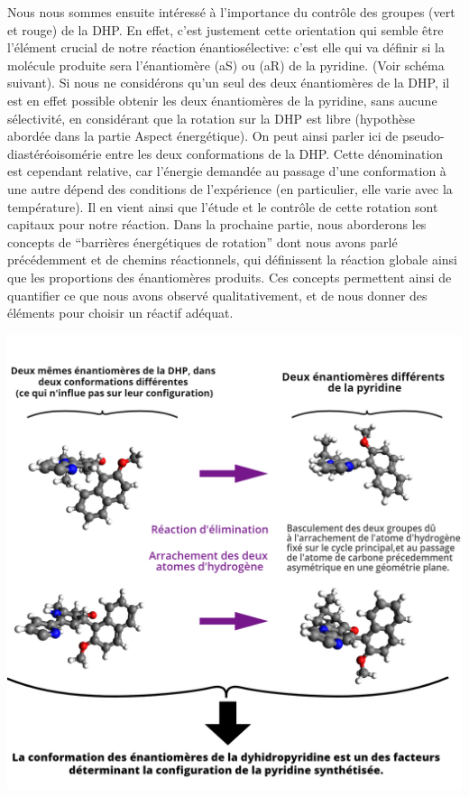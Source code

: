 \documentclass{article}
\begin{document}
Nous nous sommes ensuite intéressé à l’importance du contrôle des groupes (vert et rouge) de la DHP. En effet, c’est justement cette orientation qui semble être l’élément crucial de notre réaction énantiosélective: c’est elle qui va définir si la molécule produite sera l’énantiomère (aS) ou (aR) de la pyridine. (Voir schéma suivant).
\medbreak
Si nous ne considérons qu’un seul des deux énantiomères de la DHP, il est en effet possible obtenir les deux énantiomères de la pyridine, sans aucune sélectivité, en considérant que la rotation sur la DHP est libre (hypothèse abordée dans la partie Aspect énergétique).
On peut ainsi parler ici de pseudo-diastéréoisomérie entre les deux conformations de la DHP. Cette dénomination est cependant relative, car l'énergie demandée au passage d'une conformation à une autre dépend des conditions de l’expérience (en particulier, elle varie avec la température).
\medbreak
Il en vient ainsi que l’étude et le contrôle de cette rotation sont capitaux pour notre réaction. Dans la prochaine partie, nous aborderons les concepts de “barrières énergétiques de rotation” dont nous avons parlé précédemment et de chemins réactionnels, qui définissent la réaction globale ainsi que les proportions des énantiomères produits. Ces concepts permettent ainsi de quantifier ce que nous avons observé qualitativement, et de nous donner des éléments pour choisir un réactif adéquat.
\begin{center}
\includegraphics[scale = 0.35]{c}
\end{center}
\newpage
\end{document}
